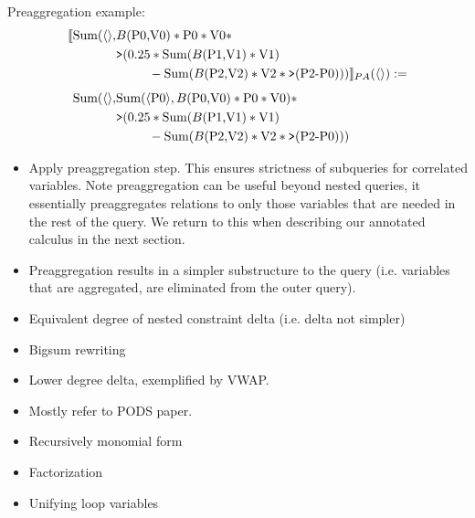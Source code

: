 \noindent Preaggregation example:
\begin{align*}
\llbracket \mbox{Sum}({\langle\rangle},
& B(\mbox{P0,V0}) * \mbox{P0} * \mbox{V0} *\\
& \mbox{{\tt >}}(0.25 * \mbox{Sum}(B(\mbox{P1,V1}) * \mbox{V1}) \\
& \qquad \; \; - \mbox{Sum}(B(\mbox{P2,V2}) * \mbox{V2} * \mbox{{\tt >}}(\mbox{P2-P0}))) \rrbracket_{PA}({\langle\rangle}) :=
\\[1ex]
\mbox{Sum}({\langle\rangle},
& \mbox{Sum}({\langle\mbox{P0}\rangle}, B(\mbox{P0,V0}) * \mbox{P0} * \mbox{V0}) *\\
& \mbox{{\tt >}}(0.25 * \mbox{Sum}(B(\mbox{P1,V1}) * \mbox{V1}) \\
& \qquad \; \; - \mbox{Sum}(B(\mbox{P2,V2}) * \mbox{V2} * \mbox{{\tt >}}(\mbox{P2-P0})))
\end{align*}

\begin{itemize}
  \item Apply preaggregation step. This ensures strictness of subqueries for
  correlated variables. Note preaggregation can be useful beyond nested
  queries, it essentially preaggregates relations to only those variables that
  are needed in the rest of the query. We return to this when describing our
  annotated calculus in the next section.
  \item Preaggregation results in a simpler substructure to the query (i.e.
  variables that are aggregated, are eliminated from the outer query).
  \item Equivalent degree of nested constraint delta (i.e. delta not simpler)
  \item Bigsum rewriting
  \item Lower degree delta, exemplified by VWAP.
\end{itemize}


\begin{itemize}
  \item Mostly refer to PODS paper.
\end{itemize}

\begin{itemize}
  \item Recursively monomial form
  \item Factorization
  \item Unifying loop variables
\end{itemize}



